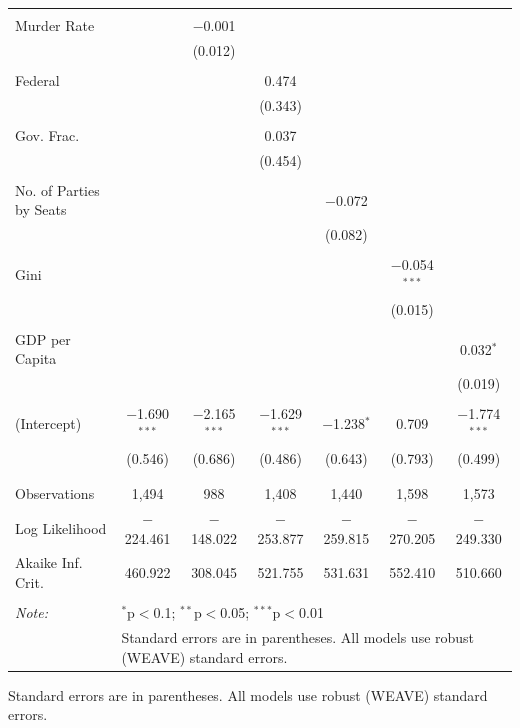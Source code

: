 \documentclass[a4paper]{article}\usepackage[]{graphicx}\usepackage[]{color}
\begin{document}
\begin{table}
\begin{center}
{\begin{tabular}{@{\extracolsep{5pt}}lcccccc}
  & & & & & & \\ 
 Murder Rate &  & $-$0.001 &  &  &  &  \\ 
  &  & (0.012) &  &  &  &  \\ 
  & & & & & & \\ 
 Federal &  &  & 0.474 &  &  &  \\ 
  &  &  & (0.343) &  &  &  \\ 
  & & & & & & \\ 
 Gov. Frac. &  &  & 0.037 &  &  &  \\ 
  &  &  & (0.454) &  &  &  \\ 
  & & & & & & \\ 
 No. of Parties by Seats &  &  &  & $-$0.072 &  &  \\ 
  &  &  &  & (0.082) &  &  \\ 
  & & & & & & \\ 
 Gini &  &  &  &  & $-$0.054$^{***}$ &  \\ 
  &  &  &  &  & (0.015) &  \\ 
  & & & & & & \\ 
 GDP per Capita &  &  &  &  &  & 0.032$^{*}$ \\ 
  &  &  &  &  &  & (0.019) \\ 
  & & & & & & \\ 
 (Intercept) & $-$1.690$^{***}$ & $-$2.165$^{***}$ & $-$1.629$^{***}$ & $-$1.238$^{*}$ & 0.709 & $-$1.774$^{***}$ \\ 
  & (0.546) & (0.686) & (0.486) & (0.643) & (0.793) & (0.499) \\ 
  & & & & & & \\ 
\hline \\[-1.8ex] 
Observations & 1,494 & 988 & 1,408 & 1,440 & 1,598 & 1,573 \\ 
Log Likelihood & $-$224.461 & $-$148.022 & $-$253.877 & $-$259.815 & $-$270.205 & $-$249.330 \\ 
Akaike Inf. Crit. & 460.922 & 308.045 & 521.755 & 531.631 & 552.410 & 510.660 \\ 
\hline 
\hline \\[-1.8ex] 
\textit{Note:}  & \multicolumn{6}{l}{$^{*}$p$<$0.1; $^{**}$p$<$0.05; $^{***}$p$<$0.01} \\ 
 & \multicolumn{6}{l}{Standard errors are in parentheses. All models use robust (WEAVE) standard errors.} \\ 
\end{tabular} 

}
\end{center}
{\scriptsize{
    Standard errors are in parentheses. All models use robust (WEAVE) standard errors. \\
}}
\end{table}
\end{document}
